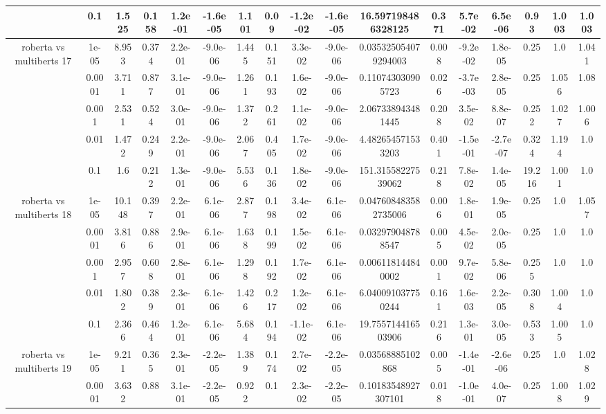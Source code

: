 \begin{tabular}{|c|c|c|c|c|c|c|c|c|c|c|c|c|c|c|c|c|}
 & 0.1 & 1.525 & 0.158 & 1.2e-01 & -1.6e-05 & 1.101 & 0.09 & -1.2e-02 & -1.6e-05 & 16.597198486328125 & 0.371 & 5.7e-02 & 6.5e-06 & 0.93 & 1.003 & 1.003 \\
\hline
\multirow{5}{*}{roberta  vs multiberts 17} & 1e-05 & 8.953 & 0.374 & 2.2e-01 & -9.0e-06 & 1.445 & 0.151 & 3.3e-02 & -9.0e-06 & 0.035325054079294003 & 0.008 & -9.2e-02 & 1.8e-05 & 0.25 & 1.0 & 1.041 \\
 & 0.0001 & 3.711 & 0.877 & 3.1e-01 & -9.0e-06 & 1.261 & 0.193 & 1.6e-02 & -9.0e-06 & 0.110743030905723 & 0.026 & -3.7e-03 & 2.8e-05 & 0.25 & 1.056 & 1.08 \\
 & 0.001 & 2.531 & 0.524 & 3.0e-01 & -9.0e-06 & 1.372 & 0.261 & 1.1e-02 & -9.0e-06 & 2.067338943481445 & 0.208 & 3.5e-02 & 8.8e-07 & 0.252 & 1.027 & 1.006 \\
 & 0.01 & 1.472 & 0.249 & 2.2e-01 & -9.0e-06 & 2.067 & 0.405 & 1.7e-02 & -9.0e-06 & 4.482654571533203 & 0.401 & -1.5e-01 & -2.7e-07 & 0.324 & 1.194 & 1.0 \\
 & 0.1 & 1.6 & 0.212 & 1.3e-01 & -9.0e-06 & 5.536 & 0.136 & 1.8e-02 & -9.0e-06 & 151.31558227539062 & 0.218 & 7.8e-02 & 1.4e-05 & 19.216 & 1.001 & 1.0 \\
\hline
\multirow{5}{*}{roberta  vs multiberts 18} & 1e-05 & 10.148 & 0.397 & 2.2e-01 & 6.1e-06 & 2.877 & 0.198 & 3.4e-02 & 6.1e-06 & 0.047608483582735006 & 0.006 & 1.8e-01 & 1.9e-05 & 0.25 & 1.0 & 1.057 \\
 & 0.0001 & 3.816 & 0.886 & 2.9e-01 & 6.1e-06 & 1.638 & 0.199 & 1.5e-02 & 6.1e-06 & 0.032979048788547 & 0.005 & 4.5e-02 & 2.0e-05 & 0.25 & 1.0 & 1.0 \\
 & 0.001 & 2.957 & 0.608 & 2.8e-01 & 6.1e-06 & 1.298 & 0.192 & 1.7e-02 & 6.1e-06 & 0.006118144840002 & 0.001 & 9.7e-02 & 5.8e-06 & 0.255 & 1.0 & 1.0 \\
 & 0.01 & 1.802 & 0.389 & 2.3e-01 & 6.1e-06 & 1.426 & 0.217 & 1.2e-02 & 6.1e-06 & 6.040091037750244 & 0.161 & 1.6e-03 & 2.2e-05 & 0.308 & 1.004 & 1.0 \\
 & 0.1 & 2.366 & 0.464 & 1.2e-01 & 6.1e-06 & 5.684 & 0.194 & -1.1e-02 & 6.1e-06 & 19.755714416503906 & 0.216 & 1.3e-01 & 3.0e-05 & 0.533 & 1.005 & 1.0 \\
\hline
\multirow{5}{*}{roberta  vs multiberts 19} & 1e-05 & 9.211 & 0.365 & 2.3e-01 & -2.2e-05 & 1.389 & 0.174 & 2.7e-02 & -2.2e-05 & 0.03568885102868 & 0.005 & -1.4e-01 & -2.6e-06 & 0.25 & 1.0 & 1.028 \\
 & 0.0001 & 3.632 & 0.88 & 3.1e-01 & -2.2e-05 & 0.922 & 0.1 & 2.3e-02 & -2.2e-05 & 0.10183548927307101 & 0.018 & -1.0e-01 & 4.0e-07 & 0.25 & 1.008 & 1.029 \\

\end{tabular}
